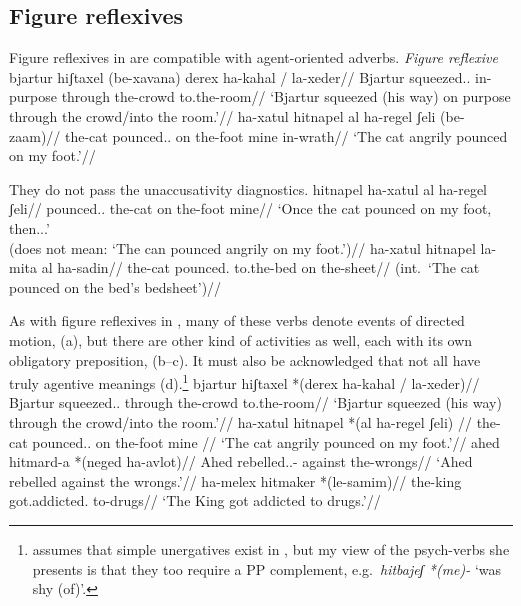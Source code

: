 	\subsection{Figure reflexives} \label{vz:thit:figrefl}
Figure reflexives in {\thit} are compatible with agent-oriented adverbs.
\pex\label{ex:vz:figrefl-va}\textit{Figure reflexive}
	\a \begingl
		\gla bjartur hiʃtaxel (be-xavana) derex ha-kahal / la-xeder//
		\glb Bjartur squeezed.. in-purpose through the-crowd {} to.the-room//
		\glft `Bjartur squeezed (his way) on purpose through the crowd/into the room.'//
		\endgl
	\a \begingl
		\gla ha-xatul hitnapel al ha-regel ʃeli (be-zaam)//
		\glb the-cat pounced.. on the-foot mine in-wrath//
		\glft `The cat angrily pounced on my foot.'//
		\endgl
\xe

They do not pass the unaccusativity diagnostics.
\ex \ljudge{\#} \begingl
		\gla hitnapel ha-xatul al ha-regel ʃeli//
		\glb pounced.. the-cat on the-foot mine//
		\glft `Once the cat pounced on my foot, then...'\\
			(does not mean: `The can pounced angrily on my foot.')//
	\endgl
\xe
\ex \ljudge{*} \begingl
	\gla ha-xatul hitnapel la-mita al ha-sadin//
	\glb the-cat pounced. to.the-bed on the-sheet//
	\glft (int.~`The cat pounced on the bed's bedsheet')//
	\endgl
\xe

As with figure reflexives in {\tnif}, many of these verbs denote events of directed motion, (\nextx a), but there are other kind of activities as well, each with its own obligatory preposition, (\nextx b--c). It must also be acknowledged that not all have truly agentive meanings (\nextx d).\footnote{\cite{siloni08} assumes that simple unergatives exist in {\thit}, but my view of the psych-verbs she presents is that they too require a PP complement, e.g.~\emph{hitbajeʃ *(me)-} `was shy (of)'.}
\pex
	\a \begingl
		\gla bjartur hiʃtaxel *(derex ha-kahal / la-xeder)//
		\glb Bjartur squeezed.. through the-crowd {} to.the-room//
		\glft `Bjartur squeezed (his way) through the crowd/into the room.'//
		\endgl
	\a \begingl
		\gla ha-xatul hitnapel *(al ha-regel ʃeli) //
		\glb the-cat pounced.. on the-foot mine //
		\glft `The cat angrily pounced on my foot.'//
		\endgl
	\a \begingl
		\gla ahed hitmard-a *(neged ha-avlot)//
		\glb Ahed rebelled..- against the-wrongs//
		\glft `Ahed rebelled against the wrongs.'//
		\endgl
	\a \begingl
		\gla ha-melex hitmaker *(le-samim)//
		\glb the-king got.addicted. to-drugs//
		\glft `The King got addicted to drugs.'//
		\endgl
\xe

